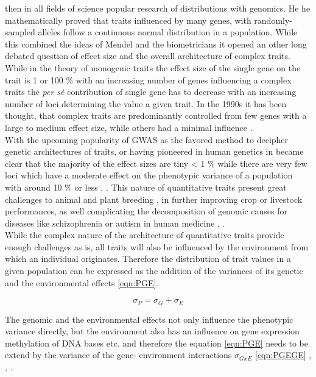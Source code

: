 then in all fields of science popular research of distributions with genomics. He he mathematically proved that traits influenced by many
genes, with randomly-sampled alleles follow a continuous normal distribution in a population. While this combined the ideas of Mendel and the
biometricians it opened an other long debated question of effect size and the overall architecture of complex traits. While in the theory of
monogenic traits the effect size of the single gene on the trait is 1 or 100 \% with an increasing number of genes influencing a complex
traits the \textit{per sè} contribution of single gene has to decrease with an increasing number of loci determining the value a given
trait. In the 1990s it has been thought, that complex traits are predominantly controlled from few genes with a large to medium effect size,
while others had a minimal influence \cite{zhang2018esti}. \\
With the upcoming popularity of GWAS as the favored method to decipher genetic architectures of traits, or having pioneered in human
genetics in became clear that the majority of the effect sizes are tiny < 1 \% while there are very few loci which have a moderate
effect on the phenotypic variance of a population with around 10 \% or less \cite{korte2013advantages}, \cite{stringer2011}.
This nature of quantitative traits present great challenges to animal \cite{goddard2009} and plant breeding \cite{wurschum2012},
in further improving crop or livestock performances, as well complicating the decomposition of genomic causes for diseases like schizophrenia
or autism in human medicine \cite{de2014}, \cite{purcell2014}. \\
While the complex nature of the architecture of quantitative traits provide enough challenges as is, all traits will also be influenced
by the environment from which an individual originates.
Therefore the distribution of trait values in a given population can be expressed as the addition of the variances of its genetic and the
environmental effects \ref{eqn:PGE}.

\begin{equation}
  \sigma_{P} = \sigma_{G} + \sigma_{E}
  \label{eqn:PGE}
\end{equation}

The genomic and the environmental effects not only influence the phenotypic variance directly, but the environment also has an influence
on gene expression methylation of DNA bases etc. and therefore the equation \ref{eqn:PGE} needs to be extend by the variance of the gene-
environment interactions $\sigma_{GxE}$  \ref{eqn:PGEGE} , \cite{lynch1998}, \cite{walsh2018}.
                                                               
